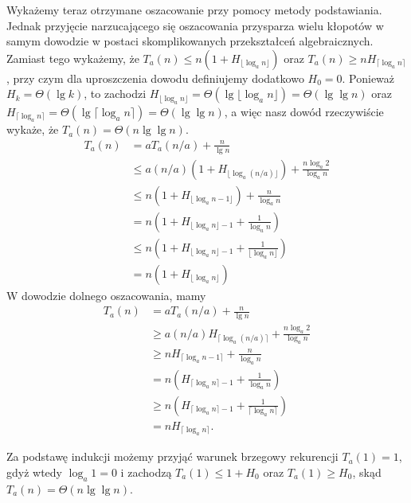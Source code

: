 Wykażemy teraz otrzymane oszacowanie przy pomocy metody podstawiania. Jednak przyjęcie narzucającego się oszacowania przysparza wielu kłopotów w samym dowodzie w postaci skomplikowanych przekształceń algebraicznych. Zamiast tego wykażemy, że $T_a(n)\le n(1+H_{\lfloor\log_an\rfloor})$ oraz $T_a(n)\ge nH_{\lceil\log_an\rceil}$, przy czym dla uproszczenia dowodu definiujemy dodatkowo $H_0=0$. Ponieważ $H_k=\Theta(\lg k)$, to zachodzi $H_{\lfloor\log_an\rfloor}=\Theta(\lg\lfloor\log_an\rfloor)=\Theta(\lg\lg n)$ oraz $H_{\lceil\log_an\rceil}=\Theta(\lg\lceil\log_an\rceil)=\Theta(\lg\lg n)$, a więc nasz dowód rzeczywiście wykaże, że $T_a(n)=\Theta(n\lg\lg n)$.
\begin{align*}
	T_a(n) &= aT_a(n/a)+\frac{n}{\lg n} \\
	&\le a(n/a)(1+H_{\lfloor\log_a(n/a)\rfloor})+\frac{n\log_a2}{\log_an} \\
	&\le n(1+H_{\lfloor\log_an-1\rfloor})+\frac{n}{\log_an} \\
	&= n\left(1+H_{\lfloor\log_an\rfloor-1}+\frac{1}{\log_an}\right) \\
	&\le n\left(1+H_{\lfloor\log_an\rfloor-1}+\frac{1}{\lfloor\log_an\rfloor}\right) \\
	&= n(1+H_{\lfloor\log_an\rfloor})
\end{align*}
W \wrong dowodzie dolnego oszacowania, mamy
\begin{align*}
	T_a(n) &= aT_a(n/a)+\frac{n}{\lg n} \\
	&\ge a(n/a)H_{\lceil\log_a(n/a)\rceil}+\frac{n\log_a2}{\log_an} \\
	&\ge nH_{\lceil\log_an-1\rceil}+\frac{n}{\log_an} \\
	&= n\left(H_{\lceil\log_an\rceil-1}+\frac{1}{\log_an}\right) \\
	&\ge n\left(H_{\lceil\log_an\rceil-1}+\frac{1}{\lceil\log_an\rceil}\right) \\
	&= nH_{\lceil\log_an\rceil}.
\end{align*}

Za podstawę indukcji możemy przyjąć warunek brzegowy rekurencji $T_a(1)=1$, gdyż wtedy $\log_a1=0$ i zachodzą $T_a(1)\le 1+H_0$ oraz $T_a(1)\ge H_0$, skąd $T_a(n)=\Theta(n\lg\lg n)$.

